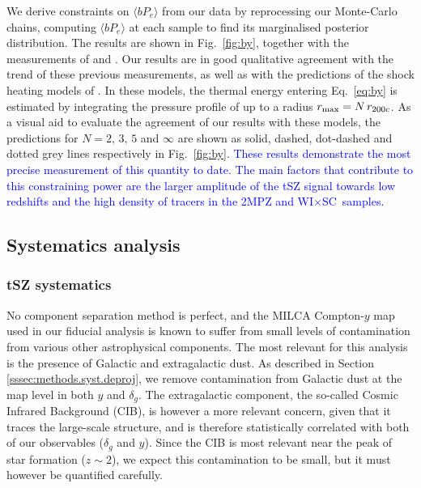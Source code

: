 \documentclass[useAMS,usenatbib]{mn2e}
\newcommand{\wisc}{WI$\times$SC}
\newcommand{\DA}[1]{\textcolor{blue}{#1}}
\begin{document}
      We derive constraints on $\langle bP_e\rangle$ from our data by reprocessing our Monte-Carlo chains, computing $\langle bP_e\rangle$ at each sample to find its marginalised posterior distribution. The results are shown in Fig.\!~\ref{fig:by}, together with the measurements of \cite{2017MNRAS.467.2315V} and \cite{2019arXiv190413347P}. Our results are in good qualitative agreement with the trend of these previous measurements, as well as with the predictions of the shock heating models of \cite{2012ApJ...758...75B}. In these models, the thermal energy entering Eq.\!~\ref{eq:by} is estimated by integrating the pressure profile of \cite{2012ApJ...758...75B} up to a radius $r_{\rm max}=N\,r_{200c}$. As a visual aid to evaluate the agreement of our results with these models, the predictions for $N=2,\,3,\,5$ and $\infty$ are shown as solid, dashed, dot-dashed and dotted grey lines respectively in Fig.\!~\ref{fig:by}. \DA{These results demonstrate the most precise measurement of this quantity to date. The main factors that contribute to this constraining power are the larger amplitude of the tSZ signal towards low redshifts and the high density of tracers in the 2MPZ and \wisc\ samples.}

  \subsection{Systematics analysis}\label{ssec:results.syst}
    \subsubsection{tSZ systematics}\label{sssec:results.syst.y}
      No component separation method is perfect, and the MILCA Compton-$y$ map used in our fiducial analysis is known to suffer from small levels of contamination from various other astrophysical components. The most relevant for this analysis is the presence of Galactic and extragalactic dust. As described in Section \ref{sssec:methods.syst.deproj}, we remove contamination from Galactic dust at the map level in both $y$ and $\delta_g$. The extragalactic component, the so-called Cosmic Infrared Background (CIB), is however a more relevant concern, given that it traces the large-scale structure, and is therefore statistically correlated with both of our observables ($\delta_g$ and $y$). Since the CIB is most relevant near the peak of star formation ($z\sim2$), we expect this contamination to be small, but it must however be quantified carefully.
      
\end{document}
